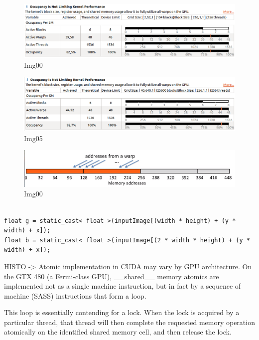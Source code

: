 \documentclass[a4paper]{article}
\begin{document}
\begin{figure}[!ht]
    \centering
    \includegraphics[width=0.7\linewidth]{profiling/darker/darker_occupancy_00}
    \caption{Img00}
    \label{fig:occ00}
\end{figure}
\FloatBarrier

\begin{figure}[!ht]
    \centering
    \includegraphics[width=0.7\linewidth]{profiling/darker/darker_06_occupancy}
    \caption{Img05}
    \label{fig:occ06}
\end{figure}
\FloatBarrier

\begin{figure}[!ht]
    \centering
    \includegraphics[width=0.7\linewidth]{profiling/darker/unaligned_load}
    \caption{Img00}
    \label{fig:unlo}
\end{figure}
\FloatBarrier

\begin{lstlisting}[label=loop, caption=Unaligned accesses]

float g = static_cast< float >(inputImage[(width * height) + (y * width) + x]);
float b = static_cast< float >(inputImage[(2 * width * height) + (y * width) + x]);

\end{lstlisting}
\FloatBarrier

 



HISTO -> Atomic implementation in CUDA may vary by GPU architecture. On the GTX 480 (a Fermi-class GPU), \_\_shared\_\_ memory atomics are implemented not as a single machine instruction, but in fact by a sequence of machine (SASS) instructions that form a loop.

This loop is essentially contending for a lock. When the lock is acquired by a particular thread, that thread will then complete the requested memory operation atomically on the identified shared memory cell, and then release the lock.
\end{document}
